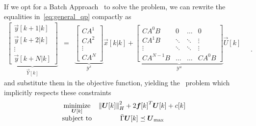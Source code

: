 \documentclass[../main.tex]{subfiles}
\begin{document}
If we opt for a Batch Approach~\cite[Chapter 8.2]{BorrelliEtAl2017} to solve the problem, we can rewrite the equalities in~\eqref{eq:general_qp} compactly as
\begin{equation}
    \begin{matrix}
      \underbrace{
        \left[
          \begin{matrix}
            \vec{y}[k+1|k] \\
            \vec{y}[k+2|k] \\
            \vdots \\
            \vec{y}[k+N|k]
          \end{matrix}
        \right]
      }_{\vec{Y}[k]} &=&
      \underbrace{
        \left[
          \begin{matrix}
            CA^{1} \\
            CA^{2} \\
            \vdots \\
            CA^{N}
          \end{matrix}
        \right]
      }_{\mathcal{Y}^{x}}
      \vec{x}[k|k]+
      \underbrace{
        \left[
          \begin{matrix}
            CA^{0}B & 0 & \dots & 0 \\
            CA^{1}B& \ddots & \ddots & \vdots      \\
            \vdots     & \ddots   & \ddots & \vdots    \\
            CA^{N-1}B & \dots & \dots & CA^{0}B
          \end{matrix}
        \right]
      }_{\mathcal{Y}^{u}}
      \vec{U}[k]
    \end{matrix}
    \quad .
\end{equation}
and substitute them in the objective function, yielding the \qp\ problem which implicitly respects these constraints
\begin{equation}
  \label{eq:quadratic_objective_compact_batch}
  \begin{aligned}
    \begin{matrix}
      \underset{\boldsymbol{U}[k]}{\mathrm{minimize}} &
      \left\lVert\boldsymbol{U}[k]\right\rVert^{2}_{H} + 2{\boldsymbol{f}[k]}^{T}\boldsymbol{U}[k] + c[k] &\\
      \mathrm{subject~ to} &
\bar{\Gamma}\boldsymbol{U}[k]\preceq {\boldsymbol{U}}_{\text{max}}
    \end{matrix}
  \end{aligned}
\end{equation}
\end{document}
